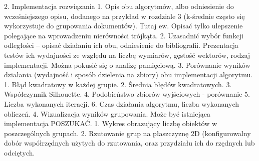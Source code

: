 \documentclass{article}
\begin{document}
	2. Implementacja rozwiązania
	1. Opis obu algorytmów, albo odniesienie do wcześniejszego opisu, dodanego na przykład w rozdziale 3 (k-średnie często się wykorzystuje do grupowania dokumentów). Tutaj ew. Opisać tylko ulepszenie polegające na wprowadzeniu nierówności trójkąta.
	2. Uzasadnić wybór funkcji odległości – opisać działaniu ich obu, odniesienie do bibliografii. Prezentacja testów ich wydajności ze względu na liczbę wymiarów, gęstość wektorów, rodzaj implementacji. Można pokusić się o analizę pamięciową.
	3. Porównanie wyników działania (wydajność i sposób dzielenia na zbiory) obu implementacji algorytmu.
	1. Błąd kwadratowy w każdej grupie. 
	2. Średnia błędów kwadratowych.
	3. Współczynnik Silhouette.
	4. Podobieństwo zbiorów wyjściowych - porównanie
	5. Liczba wykonanych iteracji.
	6. Czas działania algorytmu, liczba wykonanych obliczeń.
	4. Wizualizacja wyników grupowania. Może być istniejąca implementacja POSZUKAĆ.
	1. Wykres obrazujący liczbę obiektów w poszczególnych grupach.
	2. Rzutowanie grup na płaszczyznę 2D (konfigurowalny dobór współrzędnych użytych do rzutowania, oraz przydziału ich do rzędnych lub odciętych.
\end{document}
